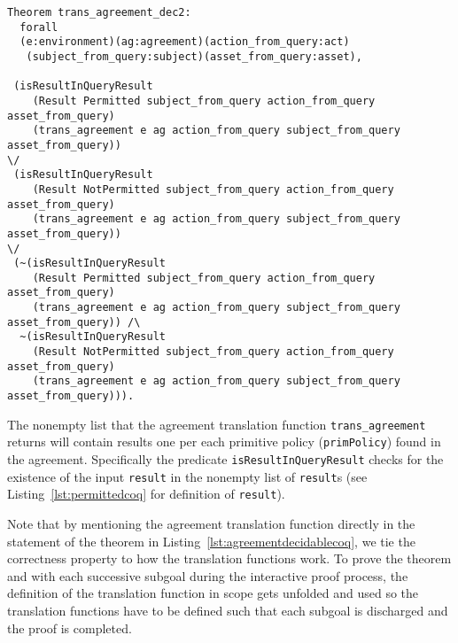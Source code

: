 \documentclass[runningheads,a4paper]{llncs}
\newcommand{\syn}{\texttt}
\begin{document}
\begin{lstlisting}
Theorem trans_agreement_dec2:
  forall
  (e:environment)(ag:agreement)(action_from_query:act)
   (subject_from_query:subject)(asset_from_query:asset),
   
 (isResultInQueryResult 
    (Result Permitted subject_from_query action_from_query asset_from_query)
    (trans_agreement e ag action_from_query subject_from_query asset_from_query)) 
\/
 (isResultInQueryResult 
    (Result NotPermitted subject_from_query action_from_query asset_from_query)
    (trans_agreement e ag action_from_query subject_from_query asset_from_query))
\/
 (~(isResultInQueryResult 
    (Result Permitted subject_from_query action_from_query asset_from_query)
    (trans_agreement e ag action_from_query subject_from_query asset_from_query)) /\
  ~(isResultInQueryResult 
    (Result NotPermitted subject_from_query action_from_query asset_from_query)
    (trans_agreement e ag action_from_query subject_from_query asset_from_query))).
\end{lstlisting}

The nonempty list that the agreement translation function \syn{trans_agreement} returns will contain results one per each primitive policy (\syn{primPolicy}) found in the agreement. Specifically the predicate \syn{isResultInQueryResult} checks for the existence of the input \syn{result} in the nonempty list of \syn{result}s (see Listing~\ref{lst:permittedcoq} for definition of \syn{result}).

Note that by mentioning the agreement translation function directly in the statement of the theorem in Listing~\ref{lst:agreementdecidablecoq}, we tie the correctness property to how the translation functions work. To prove the theorem and with each successive subgoal during the interactive proof process, the definition of the translation function in scope gets unfolded and used so the translation functions have to be defined such that each subgoal is discharged and the proof is completed. 

\end{document}
